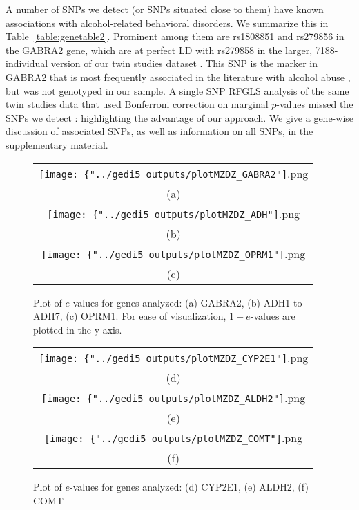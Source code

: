 A number of SNPs we detect (or SNPs situated close to them) have known associations with alcohol-related behavioral disorders. We summarize this in Table~\ref{table:genetable2}. Prominent among them are rs1808851 and rs279856 in the GABRA2 gene, which are at perfect LD with rs279858 in the larger, 7188-individual version of our twin studies dataset \citep{IronsThesis12}. This SNP is the marker in GABRA2 that is most frequently associated in the literature with alcohol abuse \citep{CuiEtal12}, but was not genotyped in our sample. A single SNP RFGLS analysis of the same twin studies data that used Bonferroni correction on marginal $p$-values missed the SNPs we detect \citep{IronsThesis12}: highlighting the advantage of our approach. We give a gene-wise discussion of associated SNPs, as well as information on all SNPs, in the supplementary material.

\begin{figure}
\begin{center}

\begin{tabular}{c}
		\texttt{[image: \{"../gedi5 outputs/plotMZDZ\_GABRA2"]}.png}\\
		(a)\\
		\texttt{[image: \{"../gedi5 outputs/plotMZDZ\_ADH"]}.png} \\
		(b)\\	
		\texttt{[image: \{"../gedi5 outputs/plotMZDZ\_OPRM1"]}.png}\\
		(c)\\	
\end{tabular}

\caption{Plot of $e$-values for genes analyzed: (a) GABRA2, (b) ADH1 to ADH7, (c) OPRM1. For ease of visualization, $1 - e$-values are plotted in the y-axis.}
\label{fig:geneplot1}

\end{center}
\end{figure}

\begin{figure}
\begin{center}

\begin{tabular}{c}
		\texttt{[image: \{"../gedi5 outputs/plotMZDZ\_CYP2E1"]}.png}\\
		(d)\\
		\texttt{[image: \{"../gedi5 outputs/plotMZDZ\_ALDH2"]}.png} \\
		(e)\\	
		\texttt{[image: \{"../gedi5 outputs/plotMZDZ\_COMT"]}.png}\\
		(f)\\	
\end{tabular}

\caption{Plot of $e$-values for genes analyzed: (d) CYP2E1, (e) ALDH2, (f) COMT}
\label{fig:geneplot2}

\end{center}
\end{figure}

